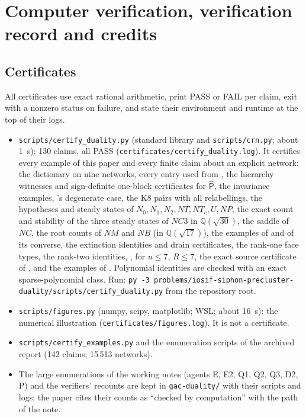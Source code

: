 \documentclass[11pt,a4paper]{report}
\newcommand{\Ph}{\widehat{\mathsf{P}}}
\begin{document}
\section{Computer verification, verification record and credits}\label{sec:verification}

\subsection{Certificates}

All certificates use exact rational arithmetic, print PASS or FAIL per claim, exit with a nonzero status on failure, and
state their environment and runtime at the top of their logs.
\begin{itemize}
\item \texttt{scripts/certify\_duality.py} (standard library and \texttt{scripts/crn.py}; about 1~s): 130 claims, all PASS
(\texttt{certificates/certify\_duality.log}). It certifies every example of this paper and every finite claim about an explicit network: the dictionary on
nine networks, every entry used from , the hierarchy witnesses and sign-definite one-block
certificates for \(\Ph\), the invariance examples, 's degenerate case, the K8 pairs with all relabellings,
the hypotheses and steady states of \(N_0,N_1,N_2,NT,NT_c,U,NP\), the exact count and stability of the three steady
states of \(NC3\) in \(\mathbb{Q}(\sqrt{30})\), the saddle of \(NC\), the root counts of \(NM\) and \(NB\) (in
\(\mathbb{Q}(\sqrt{17})\)), the examples of  and of its converse, the extinction identities and drain
certificates, the rank-one face types, the rank-two
identities, ,  for \(u\le7\), \(R\le7\), the exact source certificate of , and the
examples of . Polynomial identities are checked with an exact sparse-polynomial class.
Run: \texttt{py -3 problems/iosif-siphon-precluster-duality/scripts/certify\_duality.py} from the repository root.
\item \texttt{scripts/figures.py} (numpy, scipy, matplotlib; WSL; about 16~s): the numerical illustration
 (\texttt{certificates/figures.log}). It is not a certificate.
\item \texttt{scripts/certify\_examples.py} and the enumeration scripts of the archived report (142 claims; 15\,513
networks).
\item The large enumerations of the working notes (agents E, E2, Q1, Q2, Q3, D2, P) and the verifiers' recounts are kept in
\texttt{gac-duality/} with their scripts and logs; the paper cites their counts as ``checked by computation'' with the path
of the note.
\end{itemize}
\end{document}

